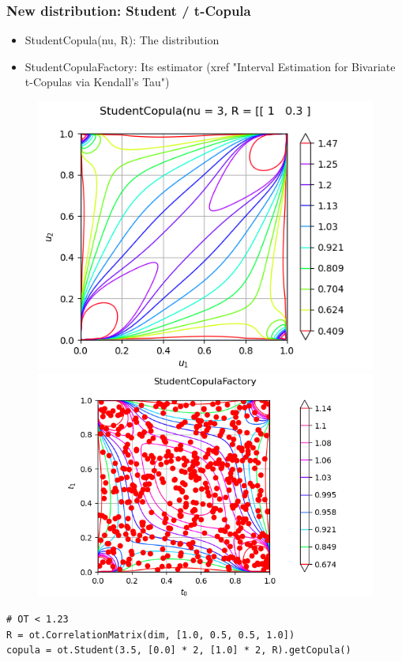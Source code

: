 \documentclass[aspectratio=169]{beamer}
\begin{document}
\begin{frame}[containsverbatim]
\frametitle{New distribution: Student / t-Copula}

\begin{itemize}
\item StudentCopula(nu, R): The distribution
\item StudentCopulaFactory: Its estimator (xref "Interval Estimation for Bivariate t-Copulas via Kendall’s Tau")
\end{itemize}

\begin{figure}
   \includegraphics[height=0.5\textheight]{figures/StudentCopula}
   \includegraphics[height=0.5\textheight]{figures/StudentCopulaFactory}
\end{figure}

\begin{small}
\lstset{language=python}
\begin{lstlisting}
# OT < 1.23
R = ot.CorrelationMatrix(dim, [1.0, 0.5, 0.5, 1.0])
copula = ot.Student(3.5, [0.0] * 2, [1.0] * 2, R).getCopula()
\end{lstlisting}
\end{small}

\end{frame}
\end{document}
